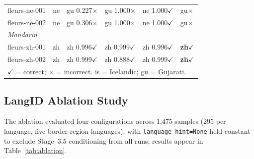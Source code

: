 \documentclass[conference]{IEEEtran}
\begin{document}
\begin{table}[htbp]
\begin{center}
\begin{tabular}{p{2.0cm}lp{2.0cm}p{1.6cm}p{1.6cm}l}
fleurs-ne-001  & ne & gu 0.227$\times$ & gu 1.000$\times$ & ne 1.000$\checkmark$ & gu$\times$ \\
fleurs-ne-002  & ne & gu 0.306$\times$ & gu 1.000$\times$ & ne 1.000$\checkmark$ & gu$\times$ \\
\midrule
\multicolumn{6}{l}{\footnotesize\textit{Mandarin}} \\
fleurs-zh-001  & zh & zh 0.996$\checkmark$ & zh 0.999$\checkmark$ & zh 0.996$\checkmark$ & \textbf{zh}$\checkmark$ \\
fleurs-zh-002  & zh & zh 0.999$\checkmark$ & zh 0.888$\checkmark$ & zh 0.999$\checkmark$ & \textbf{zh}$\checkmark$ \\
\midrule
\multicolumn{6}{l}{\footnotesize $\checkmark$ = correct; $\times$ = incorrect. is = Icelandic; gu = Gujarati.} \\
\bottomrule
\end{tabular}
\end{center}
\end{table}

\subsection{LangID Ablation Study}
\label{sec:ablation}

The ablation evaluated four configurations across 1,475 samples (295 per language, five border-region languages), with \texttt{language\_hint=None} held constant to exclude Stage~3.5 conditioning from all runs; results appear in Table~\ref{tab:ablation}.
\end{document}
